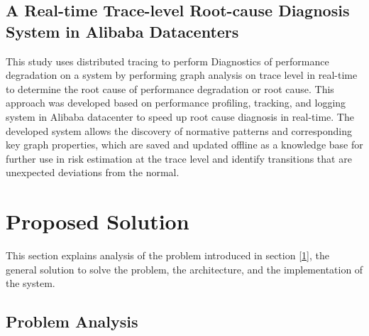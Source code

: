 \documentclass[conference]{configs/IEEEtran}
\begin{document}
\subsection{A Real-time Trace-level Root-cause Diagnosis System in Alibaba Datacenters}
This study \cite{rca-alibaba} uses distributed tracing to perform
Diagnostics of performance degradation on a system by performing graph analysis on
trace level in real-time to determine the root cause of performance degradation or
root cause. This approach was developed based on performance profiling, tracking, and logging system in Alibaba datacenter to speed up root cause diagnosis in real-time. The developed system allows the discovery of normative patterns and corresponding key graph properties, which are saved and updated offline as a knowledge base for further use in risk estimation at the trace level and identify transitions that are unexpected deviations from the normal.

\section{Proposed Solution}
This section explains analysis of the problem introduced in section \ref{1}, the general solution to solve the problem, the architecture, and the implementation of the system.

\subsection{Problem Analysis}
\end{document}
